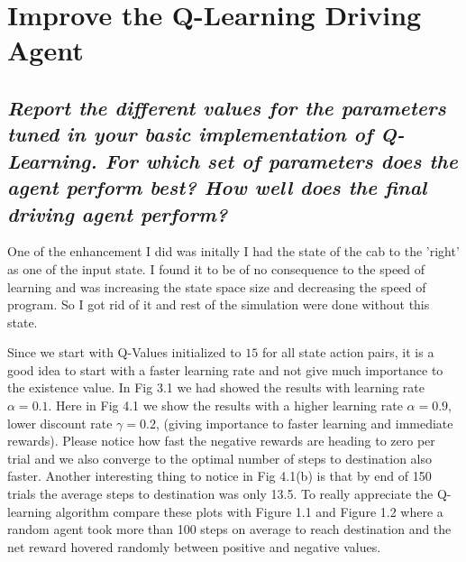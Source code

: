 \documentclass[paper=a4, fontsize=11pt]{scrartcl}
\numberwithin{equation}{section}		%
\numberwithin{figure}{section}			%
\numberwithin{table}{section}				%
\begin{document}
\pagebreak
\section{Improve the Q-Learning Driving Agent}
\subsection{ \textit{Report the different values for the parameters tuned in your basic implementation of Q-Learning. For which set of parameters does the agent perform best? How well does the final driving agent perform?}}
 
 One of the enhancement I did was initally I had the state of the cab to the 'right' as one of the input state. I found it to be of no consequence to the speed of learning and was increasing the state space size and decreasing the speed of program. So I got rid of it and rest of the simulation were done without this state. 
 
 Since we start with Q-Values initialized to $15$ for all state action pairs, it is a good idea to start with a faster learning rate and not give much importance to the existence value. In Fig 3.1 we had showed the results with learning rate $\alpha =0.1$. Here in Fig 4.1 we show the results with a higher learning rate $\alpha=0.9$, lower discount rate $\gamma =0.2$, (giving importance to faster learning and immediate rewards). Please notice how fast the negative rewards are heading to zero per trial and we also converge to the optimal number of steps to destination also faster. Another interesting thing to notice in Fig 4.1(b) is that by end of 150 trials the average steps to destination was only 13.5. To really appreciate the Q-learning algorithm compare these plots with Figure 1.1 and Figure 1.2 where a random agent took more than 100 steps on average to reach destination and the net reward hovered randomly between positive and negative values.
 
 
 
\end{document}
